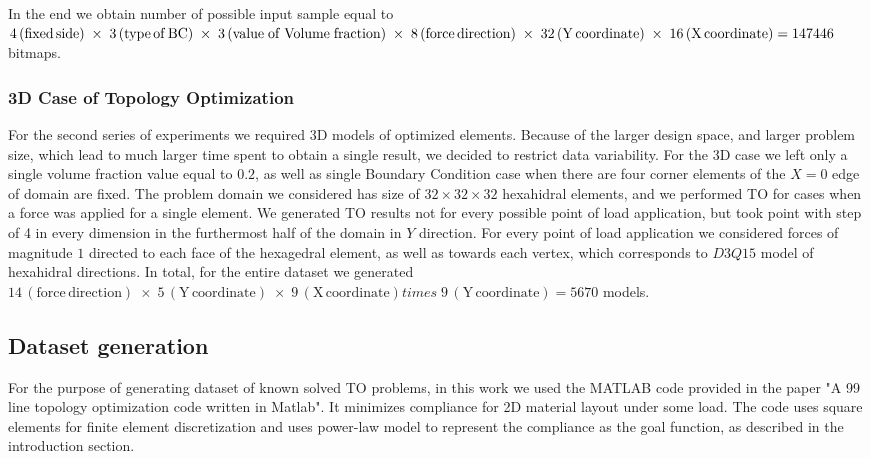 In the end we obtain number of possible input sample equal to $4\,\mathrm{(fixed \, side)} \; \times \; 3\,\mathrm{(type \, of \, BC)} \\ \; \times \; 3\,\mathrm{(value \; of \; Volume \; fraction)} \; \times \; 8\,\mathrm{(force \, direction)} \; \times \; 32\,\mathrm{(Y \, coordinate)} \; \times \; 16\,\mathrm{(X \, coordinate)} = 147446$ bitmaps.

\subsubsection{3D Case of Topology Optimization}

For the second series of experiments we required 3D models of optimized elements.
Because of the larger design space, and larger problem size, which lead to much larger time spent to obtain a single result, we decided to restrict data variability.
For the 3D case we left only a single volume fraction value equal to $0.2$, as well as single Boundary Condition case when there are four corner elements of the $ X=0 $ edge of domain are fixed.
The problem domain we considered has size of $32 \times 32 \times 32$ hexahidral elements, and we performed TO for cases when a force was applied for a single element. 
We generated TO results not for every  possible point of load application, but took point with step of 4 in every dimension in the furthermost half of the domain in $Y$ direction. 
For every point of load application we considered forces of magnitude $1$ directed to each face of the hexagedral element, as well as towards each vertex, which corresponds to $D3Q15$ model of hexahidral directions. 
In total, for the entire dataset we generated $ 14\,\mathrm{(force \, direction)} \; \times \; 5\,\mathrm{(Y \, coordinate)} \; \times \; 9\,\mathrm{(X \, coordinate)} times \; 9\,\mathrm{(Y \, coordinate)} = 5670 $ models.


\subsection{Dataset generation}

For the purpose of generating dataset of known solved TO problems, in this work we used the MATLAB code provided in the paper "A 99 line topology optimization code written in Matlab"\cite{to_99line}.
It minimizes compliance for 2D material layout under some load.
The code uses square elements for finite element discretization and uses power-law model to represent the compliance as the goal function, as described in the introduction section.
\medskip

